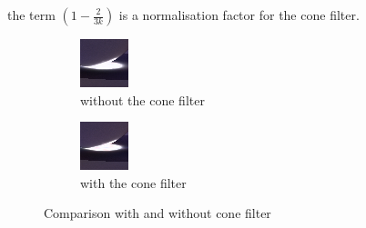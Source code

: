the term $(1 - \frac{2}{3k})$ is a normalisation factor for the cone filter. 


\begin{figure}[h]

\centering
\begin{subfigure}[b]{0.4\textwidth}
	\includegraphics[width=\textwidth]{./images/renders/no-filter.png}
	\caption{without the cone filter}
\end{subfigure}
\begin{subfigure}[b]{0.4\textwidth}
	\includegraphics[width=\textwidth]{./images/renders/filter.png}
	\caption{with the cone filter}
\end{subfigure}
\caption{Comparison with and without cone filter}

\end{figure}
